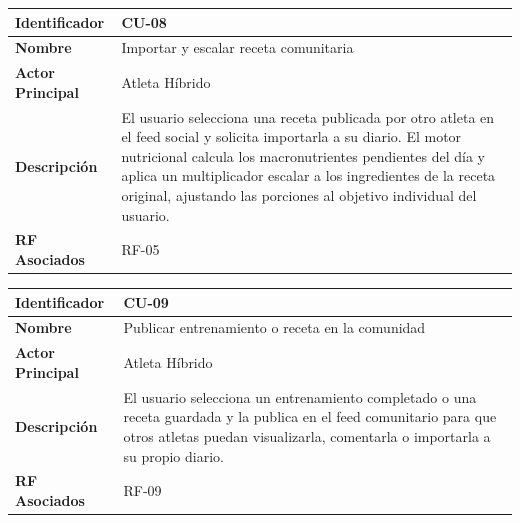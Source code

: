 \documentclass[12pt]{article}
\begin{document}
\begin{table}[h!]
    \centering
    \renewcommand{\arraystretch}{1.3}
    \begin{tabular}{|p{3.5cm}|p{11.5cm}|}
        \hline
        \rowcolor[HTML]{EFEFEF}
        \textbf{Identificador} & \textbf{CU-08} \\ \hline
        \textbf{Nombre} & Importar y escalar receta comunitaria \\ \hline
        \textbf{Actor Principal} & Atleta Híbrido \\ \hline
        \textbf{Descripción} & El usuario selecciona una receta publicada por otro atleta en el feed social y solicita importarla a su diario. El motor nutricional calcula los macronutrientes pendientes del día y aplica un multiplicador escalar a los ingredientes de la receta original, ajustando las porciones al objetivo individual del usuario. \\ \hline
        \textbf{RF Asociados} & RF-05 \\ \hline
    \end{tabular}
\end{table}

\begin{table}[h!]
    \centering
    \renewcommand{\arraystretch}{1.3}
    \begin{tabular}{|p{3.5cm}|p{11.5cm}|}
        \hline
        \rowcolor[HTML]{EFEFEF}
        \textbf{Identificador} & \textbf{CU-09} \\ \hline
        \textbf{Nombre} & Publicar entrenamiento o receta en la comunidad \\ \hline
        \textbf{Actor Principal} & Atleta Híbrido \\ \hline
        \textbf{Descripción} & El usuario selecciona un entrenamiento completado o una receta guardada y la publica en el feed comunitario para que otros atletas puedan visualizarla, comentarla o importarla a su propio diario. \\ \hline
        \textbf{RF Asociados} & RF-09 \\ \hline
    \end{tabular}
\end{table}
\end{document}
